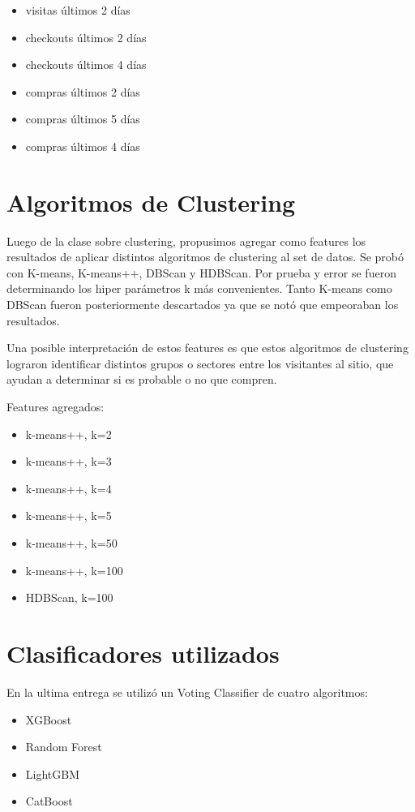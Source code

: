 \documentclass[a4paper ,12pt]{article}
\begin{document}
	
\begin{itemize}
	

	\item visitas últimos 2 días 
	\item checkouts últimos 2 días
	\item checkouts últimos 4 días
	\item compras últimos 2 días
	\item compras últimos 5 días
	\item compras últimos 4 días
	
	
\end{itemize}

\section{Algoritmos de Clustering}

Luego de la clase sobre clustering, propusimos agregar como features los resultados de aplicar distintos algoritmos de clustering al set de datos. Se probó con K-means, K-means++, DBScan y HDBScan. Por prueba y error se fueron determinando los hiper parámetros k más convenientes. Tanto K-means como DBScan fueron posteriormente descartados ya que se notó que empeoraban los resultados.

Una posible interpretación de estos features es que estos algoritmos de clustering lograron identificar distintos grupos o sectores entre los visitantes al sitio, que ayudan a determinar si es probable o no que compren.

Features agregados:
\begin{itemize}
	\item k-means++, k=2
	\item k-means++, k=3
	\item k-means++, k=4
	\item k-means++, k=5
	\item k-means++, k=50
	\item k-means++, k=100
	\item HDBScan, k=100
\end{itemize}


\newpage
\section{Clasificadores utilizados}

En la ultima entrega se utilizó un Voting Classifier de cuatro algoritmos:

\begin{itemize}
	
	\item XGBoost
	
	\item Random Forest 
	
	\item LightGBM
	
	\item CatBoost
	
\end{itemize}
\end{document}
